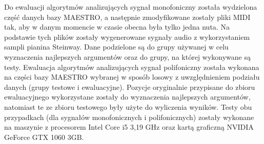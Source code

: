\documentclass[12pt,a4paper,twoside]{mwart}
\begin{document}
Do ewaluacji algorytmów analizujących sygnał monofoniczny została wydzielona część danych bazy MAESTRO, a następnie zmodyfikowane zostały pliki MIDI tak, aby w danym momencie w czasie obecna była tylko jedna nuta. Na podstawie tych plików zostały wygenerowane sygnały audio z wykorzystaniem sampli pianina Steinway. Dane podzielone są do grupy używanej w celu wyznaczenia najlepszych argumentów oraz do grupy, na której wykonywane są testy. Ewaluacja algorytmów analizujących sygnał polifoniczny została wykonana na części bazy MAESTRO wybranej w sposób losowy z uwzględnieniem podziału danych (grupy testowe i ewaluacyjne). Pozycje oryginalnie przypisane do zbioru ewaluacyjnego wykorzystane zostały do wyznaczenia najlepszych argumentów, natomiast te ze zbioru testowego były użyte do wyliczenia wyników. Testy obu przypadkach (dla sygnałów monofonicznych i polifonicznych) zostały wykonane na maszynie z procesorem Intel Core i5 3,19 GHz oraz kartą graficzną NVIDIA GeForce GTX 1060 3GB.
\end{document}
